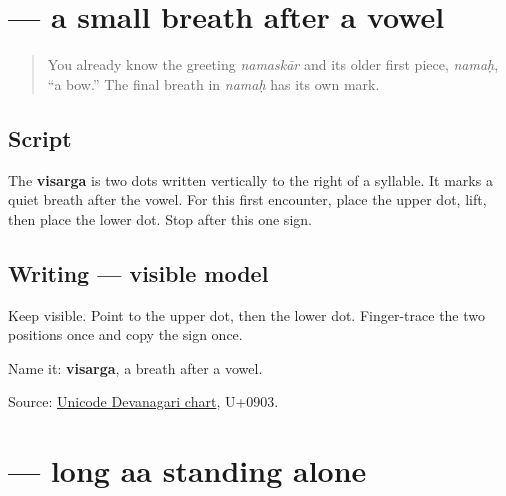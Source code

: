 \section[\texorpdfstring{\mr{ः} (ḥ)}{ः (ḥ)}]{ — a small breath after a vowel}

\label{lesson:MR-W02-visarga}



\begin{quote}
You already know the greeting \emph{namaskār} and its older first piece, \emph{namaḥ}, \textquotedblleft{}a bow.\textquotedblright{} The final breath in \emph{namaḥ} has its own mark.
\end{quote}

\subsection*{Script}
\begin{quote}
\end{quote}

The \textbf{visarga} is two dots written vertically to the right of a syllable. It marks a quiet breath after the vowel. For this first encounter, place the upper dot, lift, then place the lower dot. Stop after this one sign.

\subsection*{Writing — visible model}

Keep \textbf{} visible. Point to the upper dot, then the lower dot. Finger-trace the two positions once and copy the sign once.

\begin{tcolorbox}[breakable,colback=teal!4,colframe=teal!35!black,title={Before you move on}]
Name it: \textbf{visarga}, a breath after a vowel.

Source: \href{https://www.unicode.org/charts/PDF/U0900.pdf}{Unicode Devanagari chart}, U+0903.
\end{tcolorbox}
\section[\texorpdfstring{\mr{आ} (ā)}{आ (ā)}]{ — long aa standing alone}

\label{lesson:MR-W02-aa-independent}



